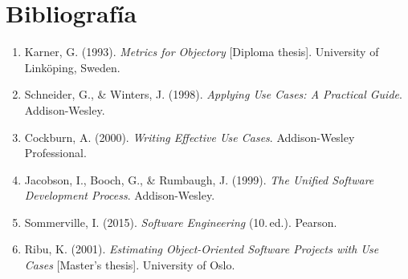 \documentclass[11pt, a4paper]{article}
\begin{document}
\section*{Bibliografía}

\begin{enumerate}
    \item Karner, G. (1993). \textit{Metrics for Objectory} [Diploma thesis]. University of Linköping, Sweden.
    \item Schneider, G., \& Winters, J. (1998). \textit{Applying Use Cases: A Practical Guide}. Addison-Wesley.
    \item Cockburn, A. (2000). \textit{Writing Effective Use Cases}. Addison-Wesley Professional.
    \item Jacobson, I., Booch, G., \& Rumbaugh, J. (1999). \textit{The Unified Software Development Process}. Addison-Wesley.
    \item Sommerville, I. (2015). \textit{Software Engineering} (10.\textordfeminine\,ed.). Pearson.
    \item Ribu, K. (2001). \textit{Estimating Object-Oriented Software Projects with Use Cases} [Master's thesis]. University of Oslo.
\end{enumerate}
\end{document}
